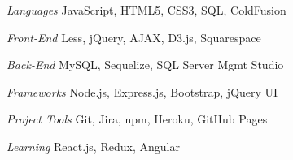 \begin{minipage}[t]{0.5\textwidth}
\begin{cvskills}

  \cvskill
    {\textit{Languages}} %
    {JavaScript, HTML5, CSS3, SQL, ColdFusion} %


 \cvskill
    {\textit{Front-End}} %
    {Less, jQuery, AJAX, D3.js, Squarespace} %


  \cvskill
    {\textit{Back-End}} %
    {MySQL, Sequelize, SQL Server Mgmt Studio} %

 
\end{cvskills}
\end{minipage}%
\begin{minipage}[t]{0.5\textwidth}
\begin{cvskills}

  \cvskill
    {\textit{Frameworks}} %
    {Node.js, Express.js, Bootstrap, jQuery UI} %


  \cvskill
    {\textit{Project Tools}} %
    {Git, Jira, npm, Heroku, GitHub Pages} %


  \cvskill
    {\textit{Learning}} %
    {React.js, Redux, Angular} %

\end{cvskills}
\end{minipage}

%
